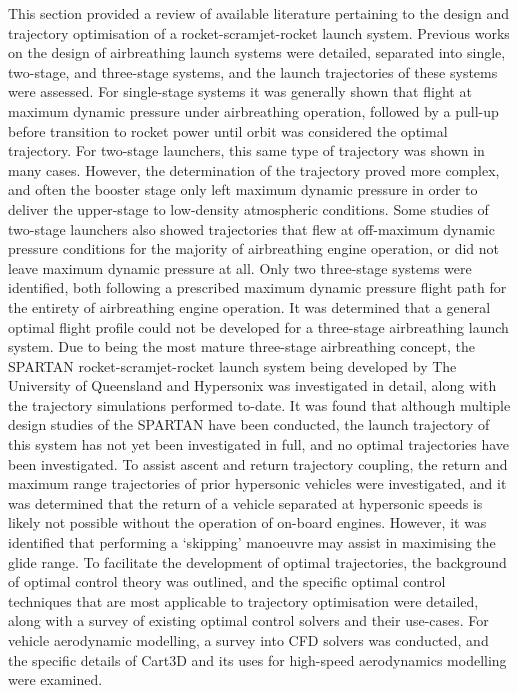 This section provided a review of available literature pertaining to the design and trajectory optimisation of a rocket-scramjet-rocket launch system.    
       Previous works on the design of airbreathing launch systems were detailed, separated into single, two-stage, and three-stage systems, and the launch trajectories of these systems were assessed. For single-stage systems it was generally shown that flight at maximum dynamic pressure under airbreathing operation, followed by a pull-up before transition to rocket power until orbit was considered the optimal trajectory. For two-stage launchers, this same type of trajectory was shown in many cases. However, the determination of the trajectory proved more complex, and often the booster stage only left maximum dynamic pressure in order to deliver the upper-stage to low-density atmospheric conditions. Some studies of two-stage launchers also showed trajectories that flew at off-maximum dynamic pressure conditions for the majority of airbreathing engine operation, or did not leave maximum dynamic pressure at all. Only two three-stage systems were identified, both following a prescribed maximum dynamic pressure flight path for the entirety of airbreathing engine operation. It was determined that a general optimal flight profile could not be developed for a three-stage airbreathing launch system.
       Due to being the most mature three-stage airbreathing concept, the SPARTAN rocket-scramjet-rocket launch system being developed by The University of Queensland and Hypersonix was investigated in detail, along with the trajectory simulations performed to-date. It was found that although multiple design studies of the SPARTAN have been conducted, the launch trajectory of this system has not yet been investigated in full, and no optimal trajectories have been investigated. 
       To assist ascent and return trajectory coupling, the return and maximum range trajectories of prior hypersonic vehicles were investigated, and it was determined that the return of a vehicle separated at hypersonic speeds is likely not possible without the operation of on-board engines. However, it was identified that performing a `skipping' manoeuvre may assist in maximising the glide range. 
       To facilitate the development of optimal trajectories, the background of optimal control theory was outlined, and the specific optimal control techniques that are most applicable to trajectory optimisation were detailed, along with a survey of existing optimal control solvers and their use-cases. 
	For vehicle aerodynamic modelling, a survey into CFD solvers was conducted, and the specific details of Cart3D and its uses for high-speed aerodynamics modelling were examined. 
